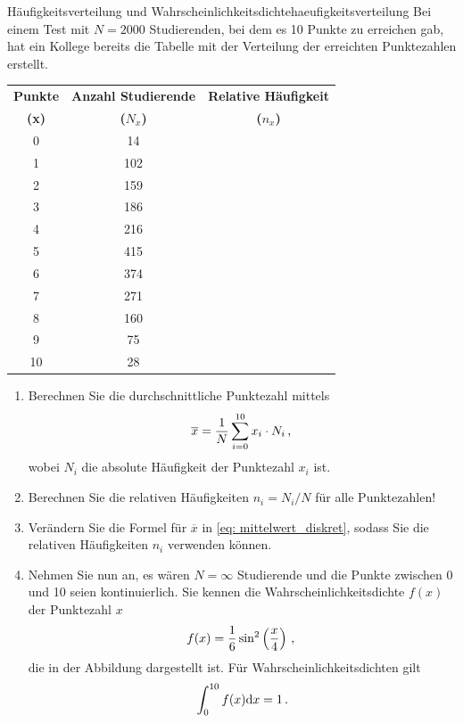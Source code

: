 \documentclass[ngerman]{scrreprt}
\begin{document}
\begin{aufgabebox}{Häufigkeitsverteilung und Wahrscheinlichkeitsdichte}{haeufigkeitsverteilung}
Bei einem Test mit $N=2000$ Studierenden, bei dem es 10 Punkte zu erreichen gab, hat ein Kollege bereits die Tabelle mit der Verteilung der erreichten Punktezahlen erstellt.

\begin{center}
\begin{tabular}{ccc}
\toprule
\textbf{Punkte} & \textbf{Anzahl Studierende} & \textbf{Relative Häufigkeit} \\
\textbf{(x)} & \textbf{($N_x$)} & \textbf{($n_x$)} \\
\midrule
0 & 14 & \\
1 & 102 & \\
2 & 159 & \\
3 & 186 & \\
4 & 216 & \\
5 & 415 & \\
6 & 374 & \\
7 & 271 & \\
8 & 160 & \\
9 & 75 & \\
10 & 28 & \\
\bottomrule
\end{tabular}
\end{center}

\begin{enumerate}
    \item Berechnen Sie die durchschnittliche Punktezahl mittels
    \begin{equation}\label{eq: mittelwert_diskret}
        \overline{x}=\frac{1}{N}\sum_{i=0}^{10}x_{i}\cdot N_{i} \,{,}\,
    \end{equation}
    wobei $N_{i}$ die absolute Häufigkeit der Punktezahl $x_{i}$ ist.
    
    \item Berechnen Sie die relativen Häufigkeiten $n_{i}=N_{i}/N$ für alle Punktezahlen!
    
    \item Verändern Sie die Formel für $\overline{x}$ in \cref{eq: mittelwert_diskret}, sodass Sie die relativen Häufigkeiten $n_{i}$ verwenden können.
    
    \item Nehmen Sie nun an, es wären $N=\infty$ Studierende und die Punkte zwischen 0 und 10 seien kontinuierlich. Sie kennen die Wahrscheinlichkeitsdichte $f(x)$ der Punktezahl $x$
    \begin{equation}\label{eq: wahrscheinlichkeitsdichte_punkte}
        f(x)=\frac{1}{6}\sin^2\left(\frac{x}{4}\right) \,{,}\,
    \end{equation}
    die in der Abbildung dargestellt ist. Für Wahrscheinlichkeitsdichten gilt 
    $$ \int_{0}^{10}f(x)\mathrm{d} x=1 \,. $$


\end{enumerate}
\end{aufgabebox}
\end{document}
